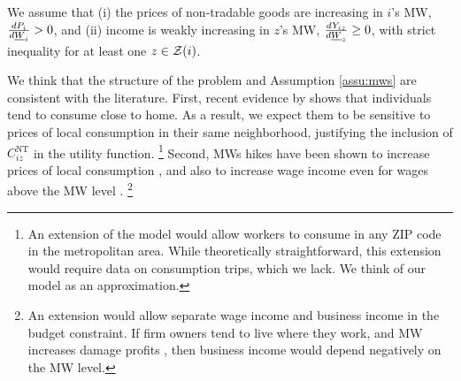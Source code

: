 \begin{assu}\label{assu:mws}
    We assume that
    (i) the prices of non-tradable goods are increasing in $i$'s MW, 
    $\frac{d P_i}{d \underline{W}_i} > 0$, and
    (ii) income is weakly increasing in $z$'s MW, 
    $\frac{d Y_{iz}}{d \underline{W}_z} \geq 0$, with strict inequality 
    for at least one $z\in\mathcal{Z}(i)$.
\end{assu}

We think that the structure of the problem and
Assumption \ref{assu:mws} are consistent with the literature.
First, recent evidence by \textcite{MiyauchiEtAl2021} shows that individuals 
tend to consume close to home.
As a result, we expect them to be sensitive to prices of local consumption in 
their same neighborhood, justifying the inclusion of $C^{\text{NT}}_{iz}$ in the 
utility function.%
\footnote{An extension of the model would allow workers to consume in any ZIP 
code in the metropolitan area.
While theoretically straightforward, this extension would require data on 
consumption trips, which we lack.
We think of our model as an approximation.}
Second, MWs hikes have been shown to increase prices of local consumption 
\parencite[e.g.,][]{AllegrettoReich2018, Leung2021},
and also to increase wage income even for wages above the MW 
level \parencite[e.g.,][]{CegnizEtAl2019,Dube2019Income}.%
\footnote{An extension would allow separate wage income and business income in 
the budget constraint.
If firm owners tend to live where they work, and MW increases damage profits
\parencite[as found by][, among others]{DracaMachinVanreenen2011},
then business income would depend negatively on the MW level.}

